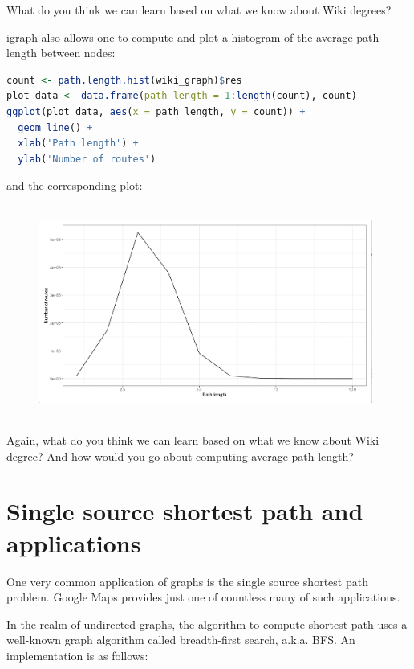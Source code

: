 What do you think we can learn based on what we know about Wiki degrees?

igraph also allows one to compute and plot a histogram of the average path length between nodes:

\begin{lstlisting}[language=R]
count <- path.length.hist(wiki_graph)$res
plot_data <- data.frame(path_length = 1:length(count), count)
ggplot(plot_data, aes(x = path_length, y = count)) +
  geom_line() +
  xlab('Path length') +
  ylab('Number of routes')
\end{lstlisting}

and the corresponding plot:

\begin{figure}[h]
\includegraphics[width=11cm, height=7cm]{img/path_len.png}
\centering
\end{figure}

Again, what do you think we can learn based on what we know about Wiki degree? And how would you go about computing average path length?

\section{Single source shortest path and applications}

One very common application of graphs is the single source shortest path problem. Google Maps provides just one of countless many of such applications.

In the realm of undirected graphs, the algorithm to compute shortest path uses a well-known graph algorithm called breadth-first search, a.k.a. BFS. An implementation is as follows:

